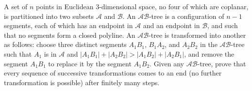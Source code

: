 A set of $n$ points in Euclidean 3-dimensional space, no four of which are coplanar, is partitioned into two subsets $\mathcal{A}$ and $\mathcal{B}$. An $\mathcal{AB}$-tree is a configuration of $n-1$ segments, each of which has an endpoint in $\mathcal{A}$ and an endpoint in $\mathcal{B}$, and such that no segments form a closed polyline. An $\mathcal{AB}$-tree is transformed into another as follows: choose three distinct segments $A_1B_1$, $B_1A_2$, and $A_2B_2$ in the $\mathcal{AB}$-tree such that $A_1$ is in $\mathcal{A}$ and $|A_1B_1|+|A_2B_2|>|A_1B_2|+|A_2B_1|$, and remove the segment $A_1B_1$ to replace it by the segment $A_1B_2$. Given any $\mathcal{AB}$-tree, prove that every sequence of successive transformations comes to an end (no further transformation is possible) after finitely many steps.